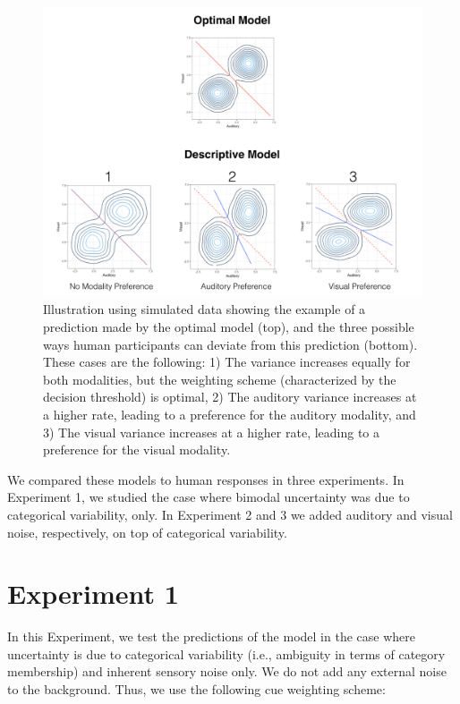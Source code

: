 \documentclass[english,,man,floatsintext]{apa6}
\theoremstyle{definition}
\theoremstyle{definition}
\theoremstyle{definition}
\theoremstyle{remark}
\begin{document}
\begin{figure}[!h]
\includegraphics[width=\textwidth]{pictures/sub-optimal} \caption{Illustration using simulated data showing the example of a prediction made by the optimal model (top), and the three possible ways human participants can deviate from this prediction (bottom). These cases are the following: 1) The variance increases equally for both modalities, but the weighting scheme (characterized by the decision threshold) is optimal, 2) The auditory variance increases at a higher rate, leading to a preference for the auditory modality, and 3) The visual variance increases at a higher rate, leading to a preference for the visual modality.}\label{fig:subOptim}
\end{figure}

We compared these models to human responses in three experiments. In
Experiment 1, we studied the case where bimodal uncertainty was due to
categorical variability, only. In Experiment 2 and 3 we added auditory
and visual noise, respectively, on top of categorical variability.

\section{Experiment 1}\label{experiment-1}

In this Experiment, we test the predictions of the model in the case
where uncertainty is due to categorical variability (i.e., ambiguity in
terms of category membership) and inherent sensory noise only. We do not
add any external noise to the background. Thus, we use the following cue
weighting scheme:
\end{document}
